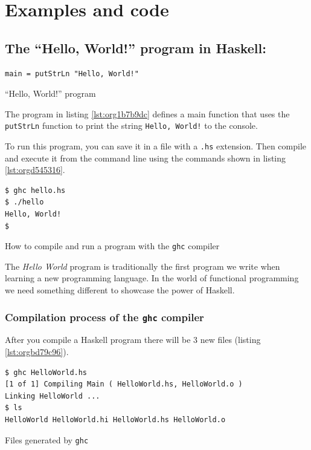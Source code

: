 \documentclass[a4paper, titlepage, twoside]{article}
\begin{document}
\section{Examples and code}
\label{sec:org78bd5c5}

\subsection{The ``Hello, World!'' program in Haskell:}
\label{sec:orgbaa01fb}

\begin{listing}[htbp]
\begin{verbatim}
main = putStrLn "Hello, World!"
\end{verbatim}
\caption{\label{lst:org1b7b9dc}``Hello, World!'' program}
\end{listing}

The program in listing \ref{lst:org1b7b9dc} defines a main function that uses the \texttt{putStrLn} function to print the string \texttt{Hello, World!} to the console.

To run this program, you can save it in a file with a \texttt{.hs} extension. Then compile and execute it from the command line using the commands shown in listing \ref{lst:orgd545316}.

\begin{listing}[htbp]
\begin{verbatim}
$ ghc hello.hs
$ ./hello
Hello, World!
$
\end{verbatim}
\caption{\label{lst:orgd545316}How to compile and run a program with the \texttt{ghc} compiler}
\end{listing}

The \emph{Hello World} program is traditionally the first program we write when learning a new programming language. In the world of functional programming we need something different to showcase the power of Haskell.

\subsubsection{Compilation process of the \texttt{ghc} compiler}
\label{sec:org4d1ceab}

After you compile a Haskell program there will be 3 new files (listing \ref{lst:orgbd79c96}).

\begin{listing}[htbp]
\begin{verbatim}
$ ghc HelloWorld.hs
[1 of 1] Compiling Main ( HelloWorld.hs, HelloWorld.o )
Linking HelloWorld ...
$ ls
HelloWorld HelloWorld.hi HelloWorld.hs HelloWorld.o
\end{verbatim}
\caption{\label{lst:orgbd79c96}Files generated by \texttt{ghc}}
\end{listing}
\end{document}
